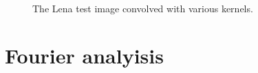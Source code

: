 \documentclass[article, 1.5space, letterpaper, 12pt, oneside, header, footer]{SydeClass}
\begin{document}
\begin{figure}[ht]
{	}
	\caption{The Lena test image convolved with various kernels.}
	\label{fig:discreteConvolution.lena}
\end{figure}



\section{Fourier analyisis}
\end{document}
